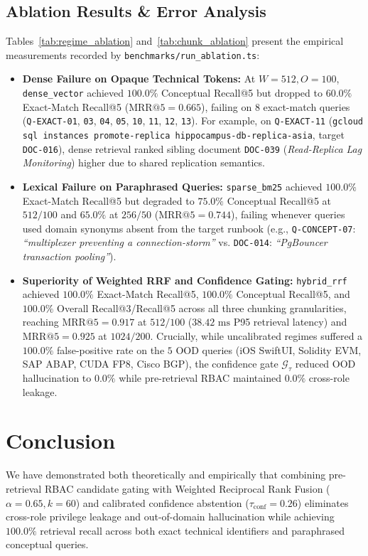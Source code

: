 \documentclass[conference]{IEEEtran}
\begin{document}
\subsection{Ablation Results \& Error Analysis}
Tables~\ref{tab:regime_ablation} and~\ref{tab:chunk_ablation} present the empirical measurements recorded by \texttt{benchmarks/run\_ablation.ts}:
\begin{itemize}
    \item \textbf{Dense Failure on Opaque Technical Tokens:} At $W=512, O=100$, \texttt{dense\_vector} achieved $100.0\%$ Conceptual Recall@5 but dropped to $60.0\%$ Exact-Match Recall@5 ($\text{MRR@5} = 0.665$), failing on $8$ exact-match queries (\texttt{Q-EXACT-01}, \texttt{03}, \texttt{04}, \texttt{05}, \texttt{10}, \texttt{11}, \texttt{12}, \texttt{13}). For example, on \texttt{Q-EXACT-11} (\texttt{gcloud sql instances promote-replica hippocampus-db-replica-asia}, target \texttt{DOC-016}), dense retrieval ranked sibling document \texttt{DOC-039} (\textit{Read-Replica Lag Monitoring}) higher due to shared replication semantics.
    \item \textbf{Lexical Failure on Paraphrased Queries:} \texttt{sparse\_bm25} achieved $100.0\%$ Exact-Match Recall@5 but degraded to $75.0\%$ Conceptual Recall@5 at $512/100$ and $65.0\%$ at $256/50$ ($\text{MRR@5} = 0.744$), failing whenever queries used domain synonyms absent from the target runbook (e.g., \texttt{Q-CONCEPT-07}: \textit{``multiplexer preventing a connection-storm''} vs. \texttt{DOC-014}: \textit{``PgBouncer transaction pooling''}).
    \item \textbf{Superiority of Weighted RRF and Confidence Gating:} \texttt{hybrid\_rrf} achieved $100.0\%$ Exact-Match Recall@5, $100.0\%$ Conceptual Recall@5, and $100.0\%$ Overall Recall@3/Recall@5 across all three chunking granularities, reaching $\text{MRR@5} = 0.917$ at $512/100$ ($38.42\text{ ms}$ P95 retrieval latency) and $\text{MRR@5} = 0.925$ at $1024/200$. Crucially, while uncalibrated regimes suffered a $100.0\%$ false-positive rate on the $5$ OOD queries (iOS SwiftUI, Solidity EVM, SAP ABAP, CUDA FP8, Cisco BGP), the confidence gate $\mathcal{G}_{\tau}$ reduced OOD hallucination to $0.0\%$ while pre-retrieval RBAC maintained $0.0\%$ cross-role leakage.
\end{itemize}

\section{Conclusion}
We have demonstrated both theoretically and empirically that combining pre-retrieval RBAC candidate gating with Weighted Reciprocal Rank Fusion ($\alpha = 0.65, k = 60$) and calibrated confidence abstention ($\tau_{\text{conf}} = 0.26$) eliminates cross-role privilege leakage and out-of-domain hallucination while achieving $100.0\%$ retrieval recall across both exact technical identifiers and paraphrased conceptual queries.
\end{document}

